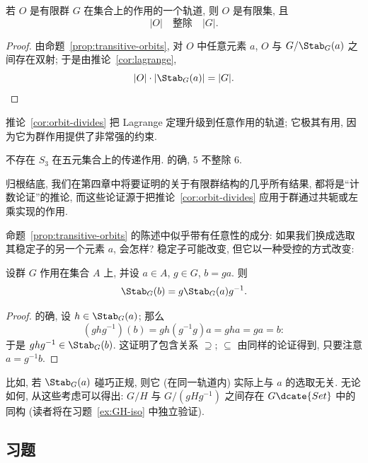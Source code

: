 \begin{corollary}
\label{cor:orbit-divides}
若 $O$ 是有限群 $G$ 在集合上的作用的一个轨道, 则 $O$ 是有限集, 且
\[
|O| \quad \text{整除} \quad |G|.
\]
\end{corollary}

\begin{proof}
由命题~\ref{prop:transitive-orbits}, 对 $O$ 中任意元素 $a$, $O$ 与 $G/\Stab_G(a)$ 之间存在双射; 于是由推论~\ref{cor:lagrange},
\[
|O| \cdot |\Stab_G(a)| = |G|.
\]
\end{proof}

推论~\ref{cor:orbit-divides} 把 Lagrange 定理升级到任意作用的轨道; 它极其有用, 因为它为群作用提供了非常强的约束.

\begin{example}
\label{ex:no-transitive-S3}
不存在 $S_3$ 在五元集合上的传递作用. 的确, $5$ 不整除 $6$.
\end{example}

归根结底, 我们在第四章中将要证明的关于有限群结构的几乎所有结果, 都将是``计数论证''的推论, 而这些论证源于把推论~\ref{cor:orbit-divides} 应用于群通过共轭或左乘实现的作用.

命题~\ref{prop:transitive-orbits} 的陈述中似乎带有任意性的成分: 如果我们换成选取其稳定子的另一个元素 $a$, 会怎样? 稳定子可能改变, 但它以一种受控的方式改变:

\begin{proposition}
\label{prop:stabilizer-conjugate}
设群 $G$ 作用在集合 $A$ 上, 并设 $a \in A$, $g \in G$, $b = ga$. 则
\[
\Stab_G(b) = g \Stab_G(a) g^{-1}.
\]
\end{proposition}

\begin{proof}
的确, 设 $h \in \Stab_G(a)$; 那么
\[
(ghg^{-1})(b) = gh(g^{-1}g)a = gha = ga = b:
\]
于是 $ghg^{-1} \in \Stab_G(b)$. 这证明了包含关系 $\supseteq$; $\subseteq$ 由同样的论证得到, 只要注意 $a = g^{-1}b$.
\end{proof}

比如, 若 $\Stab_G(a)$ 碰巧正规, 则它 (在同一轨道内) 实际上与 $a$ 的选取无关. 无论如何, 从这些考虑可以得出: $G/H$ 与 $G/(gHg^{-1})$ 之间存在 $G\dcate{Set}$ 中的同构 (读者将在习题~\ref{ex:GH-iso} 中独立验证).

\subsection*{习题}
{}

